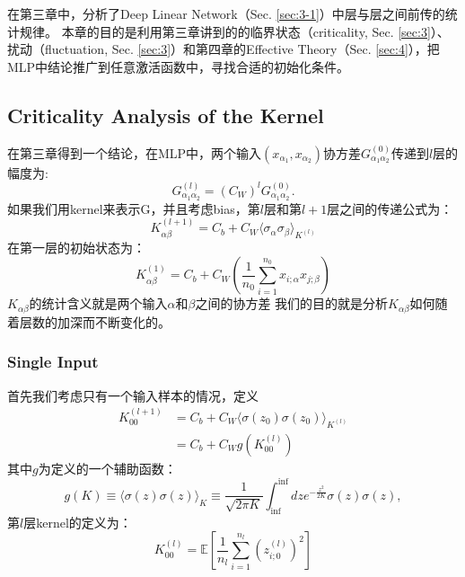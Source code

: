在第三章中，分析了Deep Linear Network（Sec. \ref{sec:3-1}）中层与层之间前传的统计规律。
本章的目的是利用第三章讲到的的临界状态（criticality, Sec. \ref{sec:3}）、扰动（fluctuation, Sec. \ref{sec:3}）和第四章的Effective Theory（Sec. \ref{sec:4}），把MLP中结论推广到任意激活函数中，寻找合适的初始化条件。

\subsection{Criticality Analysis of the Kernel}
在第三章得到一个结论，在MLP中，两个输入$(x_{\alpha_1}, x_{\alpha_2})$协方差$G_{\alpha_1\alpha_2}^{(0)}$传递到$l$层的幅度为:
\begin{equation}
    G_{\alpha_1\alpha_2}^{(l)} = (C_W)^l G_{\alpha_1\alpha_2}^{(0)}.
\end{equation} 
如果我们用kernel来表示G，并且考虑bias，第$l$层和第$l+1$层之间的传递公式为：
\begin{equation}
    K_{\alpha\beta}^{(l+1)} = C_b + C_W\langle\sigma_\alpha \sigma_\beta\rangle_{K^{(l)}}
    \label{eq:kernel_recursion}
\end{equation} 
在第一层的初始状态为：
\begin{equation}
    K_{\alpha\beta}^{(1)} = C_b + C_W(\frac{1}{n_0}\sum^{n_0}_{i=1}x_{i;\alpha}x_{j;\beta})
\end{equation}
$K_{\alpha\beta}$的统计含义就是两个输入$\alpha$和$\beta$之间的协方差
我们的目的就是分析$K_{\alpha\beta}$如何随着层数的加深而不断变化的。

\subsubsection{Single Input}
首先我们考虑只有一个输入样本的情况，定义
\begin{equation}
    \begin{aligned}
    K_{00}^{(l+1)} &= C_b + C_W\langle\sigma(z_0)\sigma(z_0)\rangle_{K^{(l)}} \\
    &= C_b + C_Wg(K_{00}^{(l)})
    \end{aligned}
\label{eq:4-1-1}
\end{equation}
其中$g$为定义的一个辅助函数：
\begin{equation}
    g(K)\equiv \langle\sigma(z)\sigma(z)\rangle_{K} \equiv \frac{1}{\sqrt{2\pi K}}\int^{\inf}_{\inf}dz e^{-\frac{z^2}{2K}}\sigma(z)\sigma(z),
\end{equation}
第$l$层kernel的定义为：
\begin{equation}
    K_{00}^{(l)} = \mathbb{E}[\frac{1}{n_{l}}\sum^{n_{l}}_{i=1}(z^{(l)}_{i;0})^2]
\end{equation}

